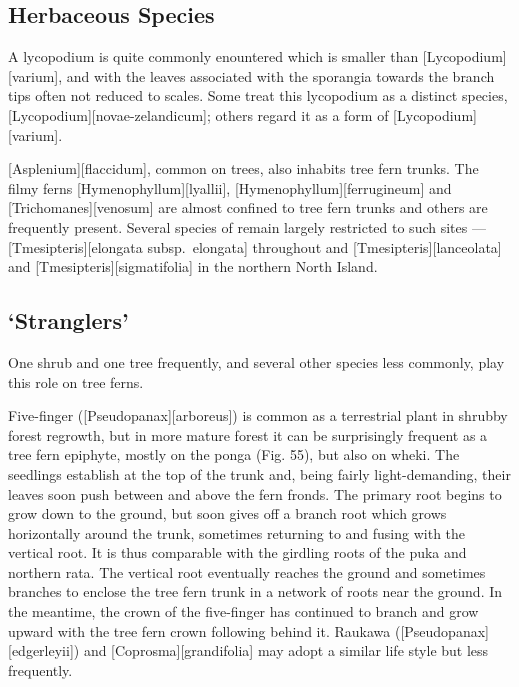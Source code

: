 \subsection{Herbaceous Species}

A lycopodium is quite commonly enountered which is smaller than [Lycopodium][varium], and with the leaves associated with the sporangia towards the branch tips often not reduced to scales.
Some treat this lycopodium as a distinct species, [Lycopodium][novae-zelandicum]; others regard it as a form of [Lycopodium][varium].

[Asplenium][flaccidum], common on trees, also inhabits tree fern trunks.
The filmy ferns [Hymenophyllum][lyallii], [Hymenophyllum][ferrugineum] and [Trichomanes][venosum] are almost confined to tree fern trunks and others are frequently present.
Several species of  remain largely restricted to such sites --- [Tmesipteris][elongata subsp.\ elongata] throughout and [Tmesipteris][lanceolata] and [Tmesipteris][sigmatifolia] in the northern North Island.

\subsection{`Stranglers'}

One shrub and one tree frequently, and several other species less commonly, play this role on tree ferns.

Five-finger ([Pseudopanax][arboreus]) is common as a terrestrial plant in shrubby forest regrowth, but in more mature forest it can be surprisingly frequent as a tree fern epiphyte, mostly on the ponga (Fig. 55), but also on wheki.
The seedlings establish at the top of the trunk and, being fairly light-demanding, their leaves soon push between and above the fern fronds.
The primary root begins to grow down to the ground, but soon gives off a branch root which grows horizontally around the trunk, sometimes returning to and fusing with the vertical root.
It is thus comparable with the girdling roots of the puka and northern rata.
The vertical root eventually reaches the ground and sometimes branches to enclose the tree fern trunk in a network of roots near the ground.
In the meantime, the crown of the five-finger has continued to branch and grow upward with the tree fern crown following behind it.
Raukawa ([Pseudopanax][edgerleyii]) and [Coprosma][grandifolia] may adopt a similar life style but less frequently.


